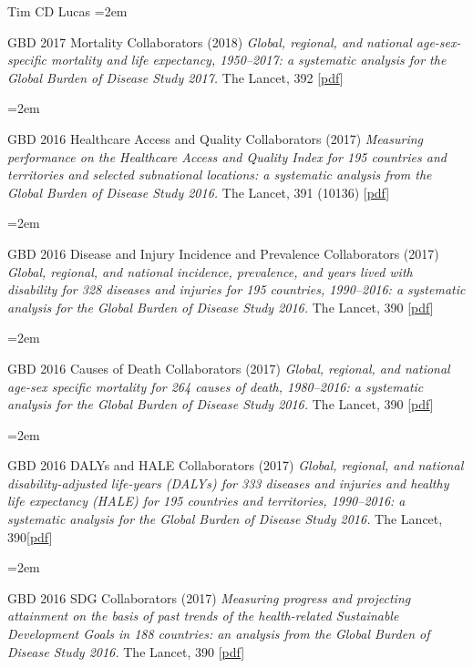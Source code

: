 \documentclass{scrartcl}
\newcommand{\MarginText}[1]{\marginpar{\raggedleft\itshape\small#1}} %
\newcommand{\Description}[1]{\hangindent=2em\hangafter=0\noindent\raggedright\footnotesize{#1}\par\normalsize\vspace{1em}} %
\begin{document}
\begin{cv}{Tim {\Large CD} Lucas}
\Description{GBD 2017 Mortality Collaborators (2018) \emph{Global, regional, and national age-sex-specific mortality and life expectancy, 1950--2017: a systematic analysis for the Global Burden of Disease Study 2017.} The Lancet, 392 [\href{https://www.sciencedirect.com/science/article/pii/S0140673618323353/pdfft?md5=06fd82a2bba62e2be2849270cc28fe17&pid=1-s2.0-S0140673618323353-main.pdf}{pdf}]}

\Description{GBD 2016 Healthcare Access and Quality Collaborators (2017) \emph{Measuring performance on the Healthcare Access and Quality Index for 195 countries and territories and selected subnational locations: a systematic analysis from the Global Burden of Disease Study 2016.} The Lancet, 391 (10136) [\href{https://www.thelancet.com/action/showPdf?pii=S0140-6736\%2817\%2932336-X}{pdf}]}



\Description{\MarginText{2017}GBD 2016 Disease and Injury Incidence and Prevalence Collaborators (2017) \emph{Global, regional, and national incidence, prevalence, and years lived with disability for 328 diseases and injuries for 195 countries, 1990--2016: a systematic analysis for the Global Burden of Disease Study 2016.} The Lancet, 390 [\href{https://www.thelancet.com/action/showPdf?pii=S0140-6736\%2817\%2932154-2}{pdf}]}

\Description{GBD 2016 Causes of Death Collaborators (2017) \emph{Global, regional, and national age-sex specific mortality for 264 causes of death, 1980--2016: a systematic analysis for the Global Burden of Disease Study 2016.} The Lancet, 390 [\href{https://www.thelancet.com/action/showPdf?pii=S0140-6736\%2817\%2932152-9}{pdf}]}

\Description{GBD 2016 DALYs and HALE Collaborators (2017) \emph{Global, regional, and national disability-adjusted life-years (DALYs) for 333 diseases and injuries and healthy life expectancy (HALE) for 195 countries and territories, 1990--2016: a systematic analysis for the Global Burden of Disease Study 2016.} The Lancet, 390[\href{https://www.thelancet.com/action/showPdf?pii=S0140-6736\%2817\%2932130-X}{pdf}]}

\Description{GBD 2016 SDG Collaborators (2017) \emph{Measuring progress and projecting attainment on the basis of past trends of the health-related Sustainable Development Goals in 188 countries: an analysis from the Global Burden of Disease Study 2016.} The Lancet, 390 [\href{https://www.thelancet.com/action/showPdf?pii=S0140-6736\%2817\%2932336-X}{pdf}]}




\end{cv}
\end{document}
